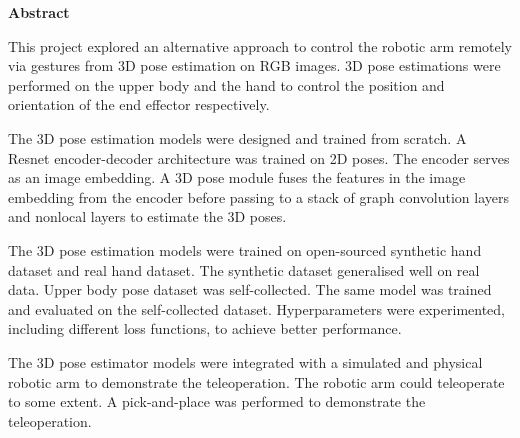 \begin{center}
    \large{\textbf{Abstract}}    
\end{center}
\noindent
This project explored an alternative approach to control the robotic arm remotely via gestures from 3D pose estimation on RGB images. 3D pose estimations were performed on the upper body and the hand to control the position and orientation of the end effector respectively.

\noindent
The 3D pose estimation models were designed and trained from scratch. A Resnet encoder-decoder architecture was trained on 2D poses. The encoder serves as an image embedding. A 3D pose module fuses the features in the image embedding from the encoder before passing to a stack of graph convolution layers and nonlocal layers to estimate the 3D poses.  

\noindent
The 3D pose estimation models were trained on open-sourced synthetic hand dataset and real hand dataset. The synthetic dataset generalised well on real data. Upper body pose dataset was self-collected. The same model was trained and evaluated on the self-collected dataset. Hyperparameters were experimented, including different loss functions, to achieve better performance.

\noindent
The 3D pose estimator models were integrated with a simulated and physical robotic arm to demonstrate the teleoperation. The robotic arm could teleoperate to some extent. A pick-and-place was performed to demonstrate the teleoperation.